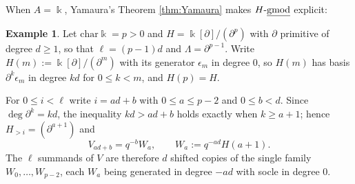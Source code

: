 \documentclass[11pt]{article}
\theoremstyle{definition}
\newtheorem{example}[thm]{Example}
\numberwithin{equation}{section}
\def\udgmod{\mbox{-\underline{gmod}}}
\newcommand{\kk}{\Bbbk}
\begin{document}
When $A=\Bbbk$,  Yamaura's Theorem \ref{thm:Yamaura} makes $H\udgmod$ explicit:

\begin{example}\label{ex:pdg-yamaura}
Let $\mathrm{char}\kk=p>0$ and $H=\kk[\partial]/(\partial^p)$ with
$\partial$ primitive of degree $d\ge1$, so that $\ell=(p-1)d$ and
$\Lambda=\partial^{p-1}$.  Write $H(m):=\kk[\partial]/(\partial^m)$ with its
generator $\epsilon_m$ in degree $0$, so $H(m)$ has basis
$\partial^k\epsilon_m$ in degree $kd$ for $0\le k<m$, and $H(p)=H$.

For $0\le i<\ell$ write $i=ad+b$ with $0\le a\le p-2$ and $0\le b<d$.  Since
$\deg\partial^k=kd$, the inequality $kd>ad+b$ holds exactly when $k\ge a+1$;
hence $H_{>i}=(\partial^{a+1})$ and
\begin{equation}\label{eq:pdg-Vi}
V_{ad+b}=q^{-b}W_a,
\qquad
W_a:=q^{-ad}H(a+1) .
\end{equation}
The $\ell$ summands of $V$ are therefore $d$ shifted copies of the single
family $W_0,\dots,W_{p-2}$, each $W_a$ being generated in degree $-ad$ with
socle in degree $0$.


\end{example}
\end{document}
